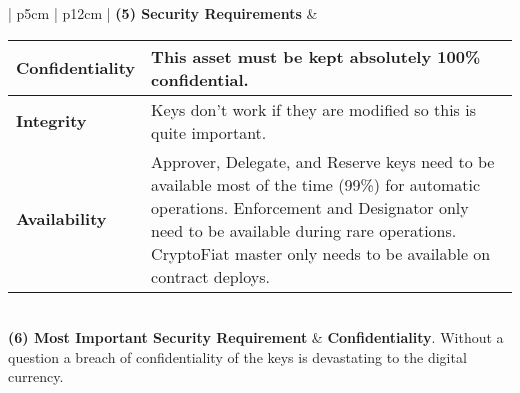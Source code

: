 \documentclass[12pt]{article} %
\begin{document}
{\begin{center}
{\begin{tabular}{ | p{5cm} | p{12cm} | }
  \textbf{(5) Security Requirements} &
  	\hskip-0.2cm
  	\begin{tabular}{p{2.5cm}|p{9.06cm}}
		\textbf{Confidentiality} & This asset must be kept absolutely 100\% confidential.
		\\ \hline
		\textbf{Integrity} & Keys don't work if they are modified so this is quite important.
		\\ \hline
		\textbf{Availability} & Approver, Delegate, and Reserve keys need to be available most of the time (99\%) for automatic operations. Enforcement and Designator only need to be available during rare operations. CryptoFiat master only needs to be available on contract deploys.
	\end{tabular}
  \\ \hline
  \textbf{(6) Most Important Security Requirement} & \textbf{Confidentiality}. Without a question a breach of confidentiality of the keys is devastating to the digital currency.
  \\ \hline
\end{tabular}
}
\end{center}
\label{tab:assetProfileEthereumAdminKeys}

}
\end{document}
